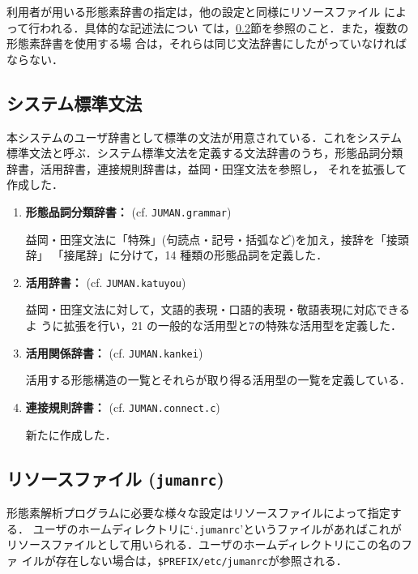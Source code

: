 \documentclass[a4j,titlepage]{jarticle}
\begin{document}
利用者が用いる形態素辞書の指定は，他の設定と同様にリソースファイル
によって行われる．具体的な記述法につい
ては，\ref{s:option}節を参照のこと．また，複数の形態素辞書を使用する場
合は，それらは同じ文法辞書にしたがっていなければならない．


\subsection{システム標準文法}
\label{ss:jds-s_dict}

本システムのユーザ辞書として標準の文法が用意されている．これをシステム
標準文法と呼ぶ．システム標準文法を定義する文法辞書のうち，形態品詞分類
辞書，活用辞書，連接規則辞書は，益岡・田窪文法\cite{Takubo89}を参照し，
それを拡張して作成した．

\begin{enumerate}

\item
{\bf 形態品詞分類辞書： }(cf. {\tt JUMAN.grammar})

益岡・田窪文法に「特殊」(句読点・記号・括弧など)を加え，接辞を「接頭辞」
「接尾辞」に分けて，14 種類の形態品詞を定義した．

\item
{\bf 活用辞書： }(cf. {\tt JUMAN.katuyou})

益岡・田窪文法に対して，文語的表現・口語的表現・敬語表現に対応できるよ
うに拡張を行い，21 の一般的な活用型と7の特殊な活用型を定義した．

\item
{\bf 活用関係辞書： }(cf. {\tt JUMAN.kankei})

活用する形態構造の一覧とそれらが取り得る活用型の一覧を定義している．

\item
{\bf 連接規則辞書： }(cf. {\tt JUMAN.connect.c})

新たに作成した．

\end{enumerate}

\subsection{リソースファイル ({\tt jumanrc})}
\label{s:option}

形態素解析プログラムに必要な様々な設定はリソースファイルによって指定する．
ユーザのホームディレクトリに`{\tt .jumanrc}'というファイルがあればこれが
リソースファイルとして用いられる．ユーザのホームディレクトリにこの名のファ
イルが存在しない場合は，\texttt{\$PREFIX/etc/jumanrc}が参照される．
\end{document}
